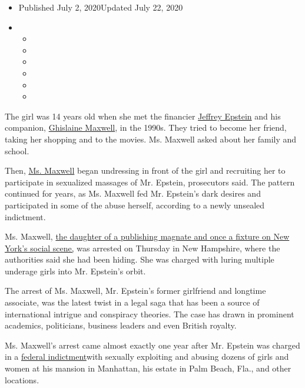 \begin{itemize}
\item
  Published July 2, 2020Updated July 22, 2020
\item
  \begin{itemize}
  \item
  \item
  \item
  \item
  \item
  \item
  \end{itemize}
\end{itemize}

The girl was 14 years old when she met the financier
\href{https://www.nytimes3xbfgragh.onion/2020/07/13/nyregion/ghislaine-maxwell-jeffrey-epstein.html}{Jeffrey
Epstein} and his companion,
\href{https://www.nytimes3xbfgragh.onion/2020/07/14/nyregion/ghislaine-maxwell-bail.html}{Ghislaine
Maxwell}, in the 1990s. They tried to become her friend, taking her
shopping and to the movies. Ms. Maxwell asked about her family and
school.

Then,
\href{https://www.nytimes3xbfgragh.onion/2020/07/14/nyregion/ghislaine-maxwell-bail.html}{Ms.
Maxwell} began undressing in front of the girl and recruiting her to
participate in sexualized massages of Mr. Epstein, prosecutors said. The
pattern continued for years, as Ms. Maxwell fed Mr. Epstein's dark
desires and participated in some of the abuse herself, according to a
newly unsealed indictment.

Ms. Maxwell,
\href{https://www.nytimes3xbfgragh.onion/2019/07/15/us/ghislaine-maxwell-epstein.html}{the
daughter of a publishing magnate and once a fixture on New York's social
scene,} was arrested on Thursday in New Hampshire, where the authorities
said she had been hiding. She was charged with luring multiple underage
girls into Mr. Epstein's orbit.

The arrest of Ms. Maxwell, Mr. Epstein's former girlfriend and longtime
associate, was the latest twist in a legal saga that has been a source
of international intrigue and conspiracy theories. The case has drawn in
prominent academics, politicians, business leaders and even British
royalty.

Ms. Maxwell's arrest came almost exactly one year after Mr. Epstein was
charged in a
\href{https://www.nytimes3xbfgragh.onion/2019/07/08/nyregion/jeffrey-epstein-charges.html?module=inline}{federal
indictment}with sexually exploiting and abusing dozens of girls and
women at his mansion in Manhattan, his estate in Palm Beach, Fla., and
other locations.

